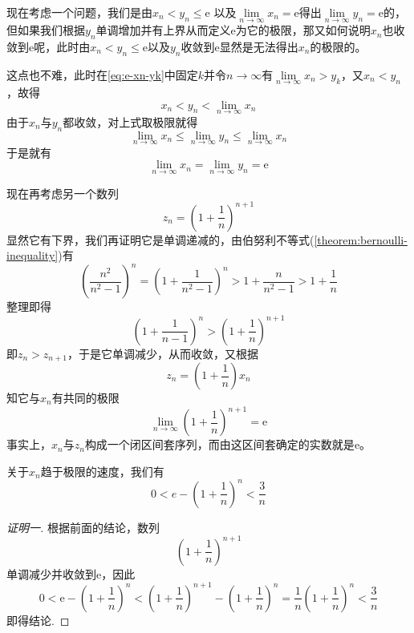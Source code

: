 现在考虑一个问题，我们是由$x_n<y_n \leqslant \mathrm{e}$ 以及$\lim\limits_{n \to \infty} x_n = \mathrm{e}$得出$\lim\limits_{n \to \infty} y_{n}=\mathrm{e}$的，但如果我们根据$y_n$单调增加并有上界从而定义$\mathrm{e}$为它的极限，那又如何说明$x_n$也收敛到$\mathrm{e}$呢，此时由$x_n<y_n\leqslant \mathrm{e}$以及$y_n$收敛到$\mathrm{e}$显然是无法得出$x_n$的极限的。

这点也不难，此时在\autoref{eq:e-xn-yk}中固定$k$并令$n\to\infty$有$\lim\limits_{n \to \infty} x_n > y_k$，又$x_n<y_n$，故得
\[ x_n < y_n < \lim_{n \to \infty} x_n \]
由于$x_n$与$y_n$都收敛，对上式取极限就得
\[ \lim_{n \to \infty} x_n \leqslant \lim_{n \to \infty}y_n \leqslant \lim_{n \to \infty} x_n \]
于是就有
\[ \lim_{n \to \infty} x_n = \lim_{n \to \infty} y_n = \mathrm{e} \]

现在再考虑另一个数列
\[ z_n = \left( 1 + \frac{1}{n} \right)^{n+1} \]
显然它有下界，我们再证明它是单调递减的，由伯努利不等式(\autoref{theorem:bernoulli-inequality})有
\[ \left( \frac{n^2}{n^2-1} \right)^n = \left( 1 + \frac{1}{n^2-1} \right)^n > 1 + \frac{n}{n^2-1} > 1 + \frac{1}{n} \]
整理即得
\[ \left( 1 + \frac{1}{n-1} \right)^n > \left( 1+ \frac{1}{n} \right)^{n+1} \]
即$z_n>z_{n+1}$，于是它单调减少，从而收敛，又根据
\[ z_n=\left( 1+\frac{1}{n} \right)x_n \]
知它与$x_n$有共同的极限
\[ \lim_{n \to \infty} \left( 1 + \frac{1}{n} \right)^{n+1} = \mathrm{e} \]
事实上，$x_n$与$z_n$构成一个闭区间套序列，而由这区间套确定的实数就是$\mathrm{e}$。

关于$x_n$趋于极限的速度，我们有
\[ 0 < e-\left( 1 + \frac{1}{n} \right)^n < \frac{3}{n} \]
\begin{proof}[证明一]
  根据前面的结论，数列
  \[ \left( 1+\frac{1}{n} \right)^{n+1} \]
  单调减少并收敛到$\mathrm{e}$，因此
  \[ 0 < \mathrm{e} - \left( 1+\frac{1}{n} \right)^n < \left( 1+\frac{1}{n} \right)^{n+1} - \left( 1+\frac{1}{n} \right)^{n} = \frac{1}{n} \left( 1+\frac{1}{n} \right)^{n} < \frac{3}{n} \]
  即得结论.
\end{proof}

